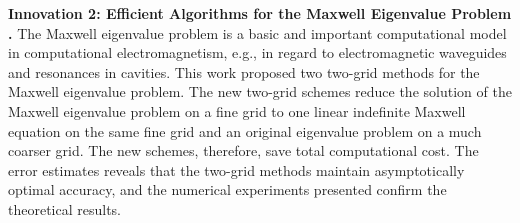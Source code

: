 \textbf{Innovation 2: Efficient Algorithms for the Maxwell Eigenvalue Problem \cite{zhou2014two}.}
The Maxwell eigenvalue problem is a basic and important computational model in computational electromagnetism, e.g., in regard to electromagnetic waveguides and resonances in cavities.
This work  proposed two two-grid methods for the Maxwell eigenvalue problem.
The new two-grid schemes reduce the solution of the Maxwell eigenvalue problem on a fine grid to one linear indefinite Maxwell equation on the same fine grid and an original eigenvalue problem on a much coarser grid. 
The new schemes, therefore, save total computational cost. 
The error estimates reveals that the two-grid methods maintain asymptotically optimal accuracy, and the numerical experiments presented confirm the theoretical results.

